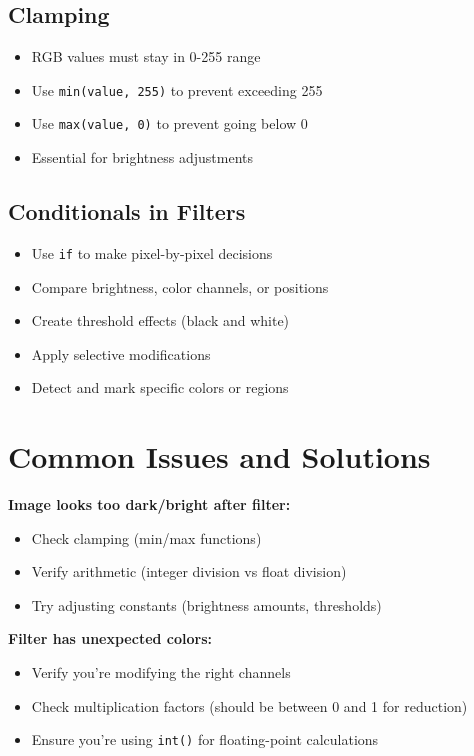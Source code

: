 \documentclass[11pt]{article}
\begin{document}
\subsection*{Clamping}
\begin{itemize}
    \item RGB values must stay in 0-255 range
    \item Use \texttt{min(value, 255)} to prevent exceeding 255
    \item Use \texttt{max(value, 0)} to prevent going below 0
    \item Essential for brightness adjustments
\end{itemize}

\subsection*{Conditionals in Filters}
\begin{itemize}
    \item Use \texttt{if} to make pixel-by-pixel decisions
    \item Compare brightness, color channels, or positions
    \item Create threshold effects (black and white)
    \item Apply selective modifications
    \item Detect and mark specific colors or regions
\end{itemize}

\section*{Common Issues and Solutions}

\textbf{Image looks too dark/bright after filter:}
\begin{itemize}
    \item Check clamping (min/max functions)
    \item Verify arithmetic (integer division vs float division)
    \item Try adjusting constants (brightness amounts, thresholds)
\end{itemize}

\textbf{Filter has unexpected colors:}
\begin{itemize}
    \item Verify you're modifying the right channels
    \item Check multiplication factors (should be between 0 and 1 for reduction)
    \item Ensure you're using \texttt{int()} for floating-point calculations
\end{itemize}
\end{document}
